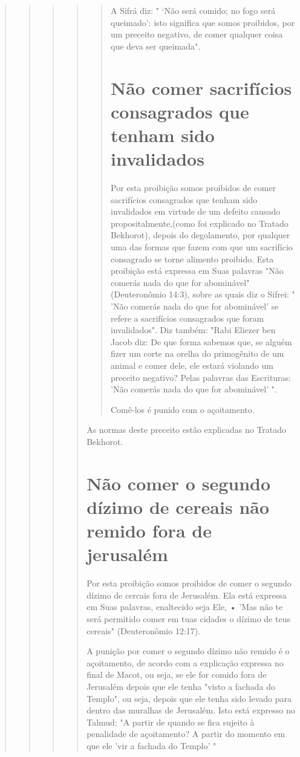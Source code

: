 \begin{quote}
\begin{quote}
\begin{quote}
\begin{quote}
\begin{quote}
A Sifrá diz: " `Não será comido; no fogo será queimado': isto signifi­ca
que somos proibidos, por um preceito negativo, de comer qualquer coisa
que deva ser queimada".

\section{Não comer sacrifícios consagrados que tenham sido invalidados}

Por esta proibição somos proibidos de comer sacrifícios consagra­dos que
tenham sido invalidados em virtude de um defeito causado
proposital­mente,(como foi explicado no Tratado Bekhorot), depois do
degolamento, por
qualquer uma das formas que fazem com que um sacrifício consagrado se
tor­ne alimento proibido. Esta proibição está expressa em Suas palavras
"Não co­merás nada do que for abominável" (Deuteronômio 14:3), sobre as
quais diz o Sifrei: " 'Não comerás nada do que for abominável' se refere
a sacrifícios con­sagrados que foram invalidados". Diz também: "Rabi
Eliezer ben Jacob diz: De que forma sabemos que, se alguém fizer um
corte na orelha do primogênito de um animal e comer dele, ele estará
violando um preceito negativo? Pelas palavras das Escrituras: 'Não
comerás nada do que for abominável' ".

Comê-los é punido com o açoitamento.
\end{quote}

As normas deste preceito estão explicadas no Tratado Bekhorot.

\section{Não comer o segundo dízimo de cereais não remido fora de jerusalém}

Por esta proibição somos proibidos de comer o segundo dízimo de cercais
fora de Jerusalém. Ela está expressa em Suas palavras, enaltecido seja
Ele, • 'Mas não te será permitido comer em tuas cidades o dízimo de teus
ce­reais" (Deuteronômio 12:17).

A punição por comer o segundo dízimo não remido é o açoitamento, de
acordo com a explicação expressa no final de Macot, ou seja, se ele for
comi­do fora de Jerusalém depois que ele tenha "visto a fachada do
Templo", ou seja, depois que ele tenha sido levado para dentro das
muralhas de Jerusalém. Isto está expresso no Talmud: "A partir de quando
se fica sujeito à penalidade de açoitamento? A partir do momento em que
ele 'vir a fachada do Templo' "


\end{quote}
\end{quote}
\end{quote}
\end{quote}
